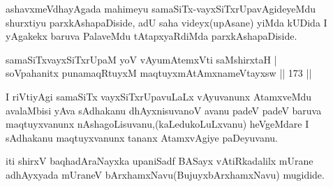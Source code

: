 \begin{artha}
ashavxmeVdhayAgada mahimeyu samaSiTx-vayxSiTxrUpavAgideyeMdu shurxtiyu parxkAshapaDiside, adU saha videyx(upAsane) yiMda kUDida I yAgakekx baruva PalaveMdu tAtapxyaRdiMda parxkAshapaDiside.
\end{artha}


\begin{shl}
samaSiTxvayxSiTxrUpaM yoV vAyumAtemxVti saMshirxtaH |\\
soV\s pahanitx punamaqRtuyxM maqtuyxmAtAmxnameVtayxsw \hfill || 173 ||
\end{shl}

\begin{artha}
I riVtiyAgi samaSiTx vayxSiTxrUpavuLaLx vAyuvanunx AtamxveMdu avalaMbisi yAva sAdhakanu dhAyxnisuvanoV avanu padeV padeV baruva maqtuyxvanunx nAshagoLisuvanu,(kaLedukoLuLxvanu) heVgeMdare I sAdhakanu maqtuyxvanunx tananx AtamxvAgiye paDeyuvanu.
\end{artha}

\begin{center}
iti shirxV baqhadAraNayxka upaniSadf BASayx vAtiRkadalilx mUrane adhAyxyada mUraneV bArxhamxNavu(BujuyxbArxhamxNavu) mugidide.
\end{center}
